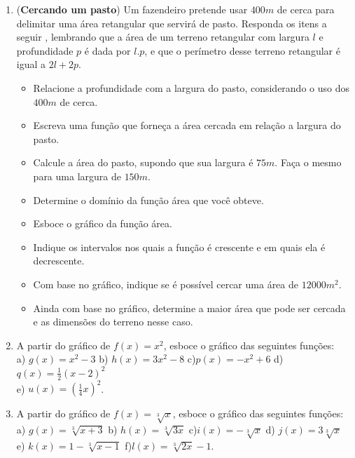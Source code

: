 \begin{enumerate}
\item (\textbf{Cercando um pasto}) Um fazendeiro pretende usar $400 m$ de cerca para delimitar uma área retangular que servirá de pasto. Responda os itens a seguir , lembrando que a área de um terreno retangular com largura $l$ e profundidade $p$ é dada por $l.p$, e que o perímetro desse terreno retangular é igual a $2l+2p$.
\begin{itemize}
\item[a)] Relacione a profundidade com a largura do pasto, considerando o uso dos $400 m$ de cerca.
\item[b)] Escreva uma função que forneça a área cercada em relação a largura do pasto.
\item[c)] Calcule a área do pasto, supondo que sua largura é $75m$. Faça o mesmo para uma largura de $150m$.
\item[d)] Determine o domínio da função área que você obteve.
\item[e)] Esboce o gráfico da função área.
\item[f)] Indique os intervalos nos quais a função é crescente e em quais ela é decrescente.
\item[g)] Com base no gráfico, indique se é possível cercar uma área de $12000 m^2$.
\item[h)] Ainda com base no gráfico, determine a maior área que pode ser cercada e as dimensões do terreno nesse caso.
\end{itemize}

\item A partir do gráfico de $f(x)=x^2$, esboce o gráfico das seguintes funções: \\
a) $g(x)= x^2-3$ \hspace{1cm} b) $h(x)= 3x^2-8$ \hspace{1cm} c)$p(x)=-x^2+6$ \hspace{1cm} d) $q(x)= \frac{1}{2}(x-2)^2$  \\ e) $u(x)=(\frac{1}{4}x)^2$.

\item A partir do gráfico de $f(x)=\sqrt[3]{x}$, esboce o gráfico das seguintes funções: \\
a) $g(x)= \sqrt[3]{x+3}$ \hspace{1cm} b) $h(x)= \sqrt[3]{3x}$ \hspace{1cm} c)$i(x)=-\sqrt[3]{x}$ \hspace{1cm} d) $j(x)= 3\sqrt[3]{x}$  \hspace{1cm} e) $k(x)=1-\sqrt[3]{x-1}$ \hspace{1cm} f)$l(x) =\sqrt[3]{2x}-1$.


\end{enumerate}
